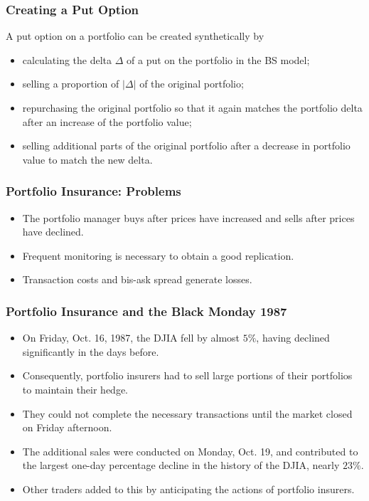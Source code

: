 \begin{frame}[fragile]
\frametitle{Creating a Put Option}
A put option on a portfolio can be created synthetically by
\begin{itemize}
  \item calculating the delta $\Delta$ of a put on the portfolio in the BS model;
  \item selling a proportion of $\vert \Delta \vert$ of the original portfolio;
  \item repurchasing the original portfolio so that it again matches the
  portfolio delta after an increase of the portfolio value;
  \item selling additional parts of the original portfolio after a decrease in
  portfolio value to match the new delta.
\end{itemize}
\end{frame}

\begin{frame}[fragile]
\frametitle{Portfolio Insurance: Problems}
\begin{itemize}
  \item The portfolio manager buys after prices have increased and sells after
  prices have declined.
  \item Frequent monitoring is necessary to obtain a good replication.
  \item Transaction costs and bis-ask spread generate losses.
\end{itemize}
\end{frame}

\begin{frame}[fragile]
\frametitle{Portfolio Insurance and the Black Monday 1987}
\begin{itemize}
  \item On Friday, Oct. 16, 1987, the DJIA fell by almost $5\%$, having declined
  significantly in the days before.
  \item Consequently, portfolio insurers had to sell large portions of their
  portfolios to maintain their hedge.
  \item They could not complete the necessary transactions until the market
  closed on Friday afternoon.
  \item The additional sales were conducted on Monday, Oct. 19, and contributed
  to the largest one-day percentage decline in the history of the DJIA, nearly
  $23\%$.
  \item Other traders added to this by anticipating the actions of portfolio
  insurers.
\end{itemize}
\end{frame}



